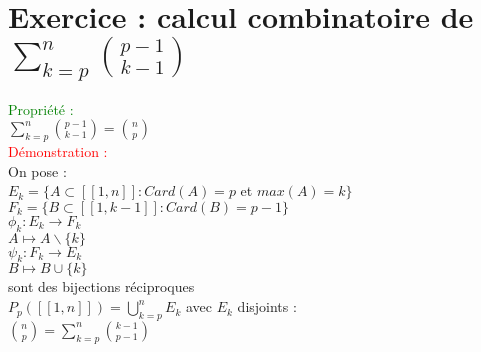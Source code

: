 \documentclass{article}
\begin{document}
\section{Exercice : calcul combinatoire de $\sum_{k=p}^n \binom{p-1}{k-1} $ }
\textcolor{green}{Propriété :} \\
$\sum_{k=p}^n \binom{p-1}{k-1}= \binom{n}{p} $ \\
\textcolor{red}{Démonstration :} \\
On pose : \\
$E_k= \lbrace A \subset [[1,n]] : Card(A)=p$ et $max(A)=k \rbrace$ \\
$F_k=\lbrace B \subset [[1,k-1]] : Card(B)=p-1 \rbrace$ \\
$\phi_k : E_k \rightarrow F_k$ \\
$A \mapsto A \backslash \lbrace k \rbrace$ \\
$\psi_k : F_k \rightarrow E_k$ \\
$B \mapsto B \cup \lbrace k \rbrace $ \\
sont des bijections réciproques \\
$P_p([[ 1,n ]] )= \bigcup_{k=p}^n E_k$  avec $E_k$ disjoints : \\
$\binom{n}{p}= \sum^n_{k=p} \binom{k-1}{p-1}$
\end{document}
